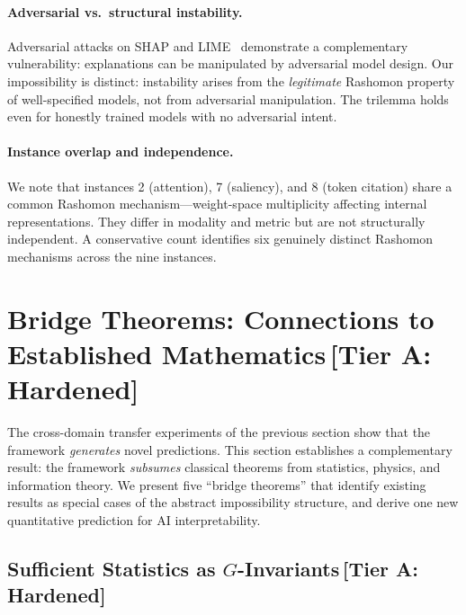 \documentclass[11pt,a4paper]{article}
\begin{document}
\paragraph{Adversarial vs.\ structural instability.}
Adversarial attacks on SHAP and LIME~\cite{ghorbani2019interpretation, slack2020fooling} demonstrate a complementary vulnerability: explanations can be manipulated by adversarial model design. Our impossibility is distinct: instability arises from the \emph{legitimate} Rashomon property of well-specified models, not from adversarial manipulation. The trilemma holds even for honestly trained models with no adversarial intent.

\paragraph{Instance overlap and independence.}
We note that instances 2 (attention), 7 (saliency), and 8 (token citation)
share a common Rashomon mechanism---weight-space multiplicity affecting
internal representations.  They differ in modality and metric but are not
structurally independent.  A conservative count identifies six genuinely
distinct Rashomon mechanisms across the nine instances.

\section{Bridge Theorems: Connections to Established Mathematics\,\textnormal{\normalsize[Tier A: Hardened]}}
\label{sec:bridge-theorems}

The cross-domain transfer experiments of the previous section show that the
framework \emph{generates} novel predictions.  This section establishes a
complementary result: the framework \emph{subsumes} classical theorems from
statistics, physics, and information theory.  We present five ``bridge
theorems'' that identify existing results as special cases of the abstract
impossibility structure, and derive one new quantitative prediction for AI
interpretability.

\subsection{Sufficient Statistics as $G$-Invariants\,\textnormal{\normalsize[Tier A: Hardened]}}
\label{sec:bridge-sufficiency}
\end{document}
